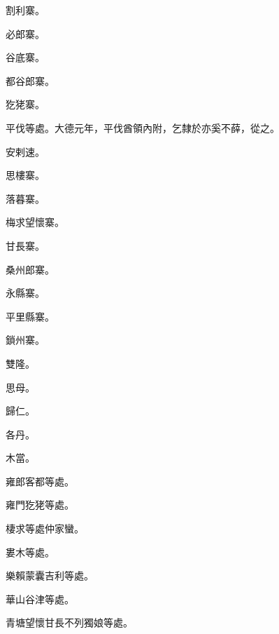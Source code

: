 \begin{pinyinscope}
 割利寨。



 必郎寨。



 谷底寨。



 都谷郎寨。



 犵狫寨。



 平伐等處。大德元年，平伐酋領內附，乞隸於亦奚不薛，從之。



 安剌速。



 思樓寨。



 落暮寨。



 梅求望懷寨。



 甘長寨。



 桑州郎寨。



 永縣寨。



 平里縣寨。



 鎖州寨。



 雙隆。



 思母。



 歸仁。



 各丹。



 木當。



 雍郎客都等處。



 雍門犵狫等處。



 棲求等處仲家蠻。



 婁木等處。



 樂賴蒙囊吉利等處。



 華山谷津等處。



 青塘望懷甘長不列獨娘等處。




\end{pinyinscope}
